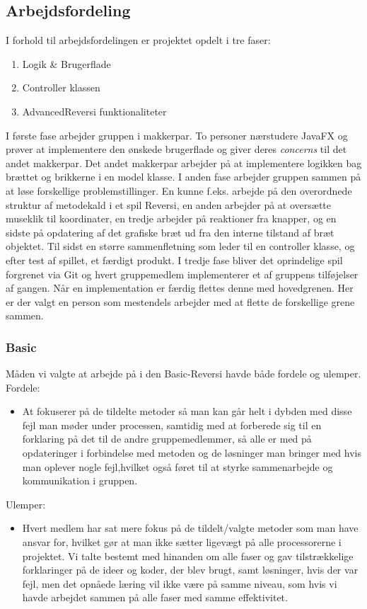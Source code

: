 \subsection{Arbejdsfordeling}
I forhold til arbejdsfordelingen er projektet opdelt i tre faser:
\begin{enumerate}
    \item Logik \& Brugerflade
    \item Controller klassen
    \item AdvancedReversi funktionaliteter
\end{enumerate}
I første fase arbejder gruppen i makkerpar. To personer nærstudere JavaFX og prøver at implementere den ønskede brugerflade og giver deres \emph{concerns} til det andet makkerpar. Det andet makkerpar arbejder på at implementere logikken bag brættet og brikkerne i en model klasse.\newline
I anden fase arbejder gruppen sammen på at løse forskellige problemstillinger. En kunne f.eks. arbejde på den overordnede struktur af metodekald i et spil Reversi, en anden arbejder på at oversætte museklik til koordinater, en tredje arbejder på reaktioner fra knapper, og en sidste på opdatering af det grafiske bræt ud fra den interne tilstand af bræt objektet. Til sidst en større sammenfletning som leder til en controller klasse, og efter test af spillet, et færdigt produkt.
I tredje fase bliver det oprindelige spil forgrenet via Git og hvert gruppemedlem implementerer et af gruppens tilføjelser af gangen. Når en implementation er færdig flettes denne med hovedgrenen. Her er der valgt en person som mestendels arbejder med at flette de forskellige grene sammen.
\subsubsection {Basic}
Måden vi valgte at arbejde på i den Basic-Reversi havde både fordele og  ulemper. \newline
Fordele: 
\begin{itemize}
\item At fokuserer på de tildelte metoder så man kan går helt i dybden med disse fejl man møder under processen, samtidig med at forberede sig til en forklaring på det til de andre gruppemedlemmer, så alle er med på opdateringer i forbindelse med metoden og de løsninger man bringer med hvis man oplever nogle fejl,hvilket også føret til at styrke sammenarbejde og kommunikation i gruppen.
\end{itemize} 
 Ulemper:
\begin{itemize}
\item Hvert medlem har sat mere fokus på de tildelt/valgte metoder som man have ansvar for, hvilket gør at man ikke sætter ligevægt på alle processorerne i projektet. Vi talte bestemt med hinanden om alle faser og gav tilstrækkelige forklaringer på de ideer og koder, der blev brugt, samt løsninger, hvis der var fejl, men det opnåede læring vil ikke være på samme niveau, som hvis vi havde arbejdet sammen på alle faser med samme effektivitet. 
\end{itemize}
